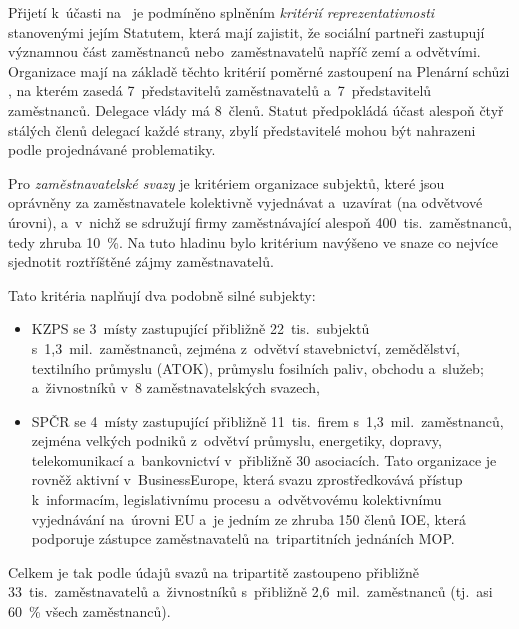 Přijetí k~účasti na~ je podmíněno splněním \textit{kritérií reprezentativnosti} stanovenými jejím Statutem, která mají zajistit, že sociální partneři zastupují významnou část zaměstnanců nebo~zaměstnavatelů napříč zemí a odvětvími. Organizace mají na základě těchto kritérií poměrné zastoupení na Plenární schůzi , na kterém zasedá 7~představitelů zaměstnavatelů a~7~představitelů zaměstnanců. Delegace vlády má 8~členů. Statut předpokládá účast alespoň čtyř stálých členů delegací každé strany, zbylí představitelé mohou být nahrazeni podle projednávané problematiky.\par

Pro \textit{zaměstnavatelské svazy} je kritériem organizace subjektů, které jsou oprávněny za zaměstnavatele kolektivně vyjednávat a~uzavírat  (na odvětvové úrovni), a~v~nichž se sdružují firmy zaměstnávající alespoň 400~tis.~zaměstnanců, tedy zhruba \SI{10}{\percent}. Na tuto hladinu bylo kritérium navýšeno ve snaze co nejvíce sjednotit roztříštěné zájmy zaměstnavatelů.~\cite{RHSD_CR}\par
Tato kritéria naplňují dva podobně silné subjekty:
\begin{itemize}[noitemsep]
    \item \acf{KZPS} se 3~místy zastupující přibližně 22~tis.~subjektů s~1,3~mil.~zaměstnanců, zejména z~odvětví stavebnictví, zemědělství, textilního průmyslu (ATOK), průmyslu fosilních paliv, obchodu a~služeb; a~živnostníků v~8 zaměstnavatelských svazech,
    \item \acf{SPČR} se 4~místy zastupující přibližně 11~tis.~firem s~1,3~mil.~zaměstnanců, zejména velkých podniků z~odvětví průmyslu, energetiky, dopravy, telekomunikací a~bankovnictví v~přibližně 30 asociacích. Tato organizace je rovněž aktivní v~BusinessEurope, která svazu zprostředkovává přístup k~informacím, legislativnímu procesu a~odvětvovému kolektivnímu vyjednávání na~úrovni \acs{EU} a~je jedním ze zhruba 150 členů \ac{IOE}, která podporuje zástupce zaměstnavatelů na~tripartitních jednáních \ac{MOP}.
\end{itemize}
Celkem je tak podle údajů svazů na tripartitě zastoupeno přibližně 33~tis.~zaměstnavatelů a~živnostníků s~přibližně 2,6~mil.~zaměstnanců (tj.~asi \SI{60}{\percent} všech zaměstnanců).~\cite{KZPS_CR_ONas}~\cite{SPCR_KdoJsme2026}\par
